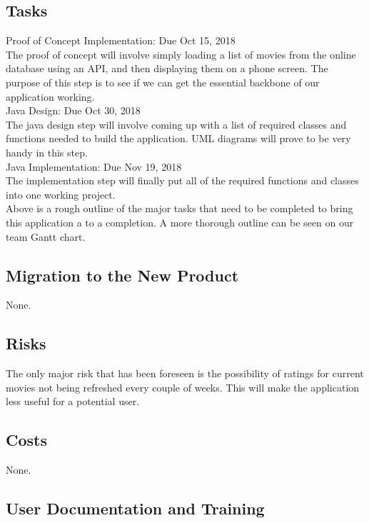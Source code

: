 \documentclass[12pt, titlepage]{article}
\begin{document}
\subsection{Tasks}

Proof of Concept Implementation:  Due Oct 15, 2018\\

The proof of concept will involve simply loading a list of movies from the online database using an API, and then displaying them on a phone screen. The purpose of this step is to see if we can get the essential backbone of our application working.\\

Java Design: Due Oct 30, 2018\\

The java design step will involve coming up with a list of required classes and functions needed to build the application. UML diagrams will prove to be very handy in this step.\\

Java Implementation: Due Nov 19, 2018\\

The implementation step will finally put all of the required functions and classes into one working project.\\

Above is a rough outline of the major tasks that need to be completed to bring this application a to a completion. A more thorough outline can be seen on our team Gantt chart. 

\subsection{Migration to the New Product}

None.

\subsection{Risks}

The only major risk that has been foreseen is the possibility of ratings for current movies not being refreshed every couple of weeks. This will make the application less useful for a potential user.

\subsection{Costs}

None.
\subsection{User Documentation and Training}
\end{document}
